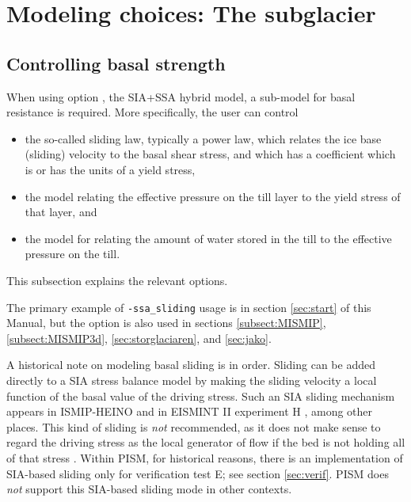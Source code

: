 \section{Modeling choices:  The subglacier}
\label{sec:modeling-subglacier}

\subsection{Controlling basal strength}  \label{subsect:basestrength}

When using option , the SIA+SSA hybrid model, a sub-model for basal resistance is required.  More specifically, the user can control\begin{itemize}
\item the so-called sliding law, typically a power law, which relates the ice base (sliding) velocity to the basal shear stress, and which has a coefficient which is or has the units of a yield stress,
\item the model relating the effective pressure on the till layer to the yield stress of that layer, and
\item the model for relating the amount of water stored in the till to the effective pressure on the till.
\end{itemize}
This subsection explains the relevant options.

The primary example of \texttt{-ssa_sliding} usage is in section \ref{sec:start} of this Manual, but the option is also used in sections \ref{subsect:MISMIP}, \ref{subsect:MISMIP3d}, \ref{sec:storglaciaren}, and \ref{sec:jako}.

A historical note on modeling basal sliding is in order.  Sliding can be added directly to a SIA stress balance model by making the sliding velocity a local function of the basal value of the driving stress.  Such an SIA sliding mechanism appears in ISMIP-HEINO \cite{Calovetal2009HEINOfinal} and in EISMINT II experiment H \cite{EISMINT00}, among other places.  This kind of sliding is \emph{not} recommended, as it does not make sense to regard the driving stress as the local generator of flow if the bed is not holding all of that stress \cite{BBssasliding,Fowler01}.  Within PISM, for historical reasons, there is an implementation of SIA-based sliding only for verification test E; see section \ref{sec:verif}.  PISM does \emph{not} support this SIA-based sliding mode in other contexts.

